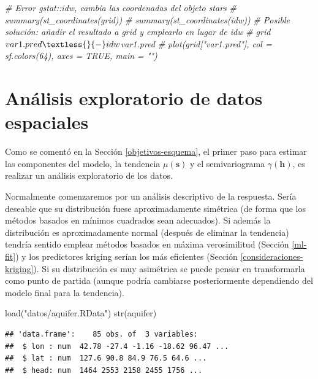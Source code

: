 \documentclass[
  spanish,
]{book}
\newenvironment{Shaded}{\begin{snugshade}}{\end{snugshade}}
\newcommand{\CommentTok}[1]{\textcolor[rgb]{0.56,0.35,0.01}{\textit{#1}}}
\newcommand{\FunctionTok}[1]{\textcolor[rgb]{0.00,0.00,0.00}{#1}}
\newcommand{\NormalTok}[1]{#1}
\newcommand{\StringTok}[1]{\textcolor[rgb]{0.31,0.60,0.02}{#1}}
\theoremstyle{break}
\theoremstyle{definition}
\theoremstyle{definition}
\theoremstyle{definition}
\theoremstyle{definition}
\theoremstyle{remark}
\begin{document}
\begin{Shaded}
\begin{Highlighting}[]
\CommentTok{\# Error gstat::idw, cambia las coordenadas del objeto stars}
\CommentTok{\# summary(st\_coordinates(grid))}
\CommentTok{\# summary(st\_coordinates(idw))}
\CommentTok{\# Posible solución: añadir el resultado a \textasciigrave{}grid\textasciigrave{} y emplearlo en lugar de \textasciigrave{}idw\textasciigrave{}}
\CommentTok{\# grid$var1.pred \textless{}{-} idw$var1.pred}
\CommentTok{\# plot(grid["var1.pred"], col = sf.colors(64), axes = TRUE, main = "")}
\end{Highlighting}
\end{Shaded}

\hypertarget{sp-eda}{%
\section{Análisis exploratorio de datos espaciales}\label{sp-eda}}

Como se comentó en la Sección \ref{objetivos-esquema}, el primer paso para estimar las componentes del modelo, la tendencia \(\mu(\mathbf{s})\) y el semivariograma \(\gamma(\mathbf{h})\), es realizar un análisis exploratorio de los datos.

Normalmente comenzaremos por un análisis descriptivo de la respuesta.
Sería deseable que su distribución fuese aproximadamente simétrica (de forma que los métodos basados en mínimos cuadrados sean adecuados).
Si además la distribución es aproximadamente normal (después de eliminar la tendencia) tendría sentido emplear métodos basados en máxima verosimilitud (Sección \ref{ml-fit}) y los predictores kriging serían los más eficientes (Sección \ref{consideraciones-kriging}).
Si su distribución es muy asimétrica se puede pensar en transformarla como punto de partida (aunque podría cambiarse posteriormente dependiendo del modelo final para la tendencia).

\begin{Shaded}
\begin{Highlighting}[]
\FunctionTok{load}\NormalTok{(}\StringTok{"datos/aquifer.RData"}\NormalTok{)}
\FunctionTok{str}\NormalTok{(aquifer)}
\end{Highlighting}
\end{Shaded}

\begin{verbatim}
## 'data.frame':    85 obs. of  3 variables:
##  $ lon : num  42.78 -27.4 -1.16 -18.62 96.47 ...
##  $ lat : num  127.6 90.8 84.9 76.5 64.6 ...
##  $ head: num  1464 2553 2158 2455 1756 ...
\end{verbatim}
\end{document}
